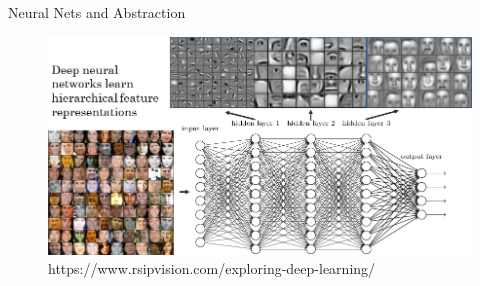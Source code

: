 \documentclass[lualatex, aspectratio=169]{beamer}
\begin{document}
\begin{frame}{Neural Nets and Abstraction}

  \begin{figure}
    \includegraphics[width=0.7\pagewidth]{assets/abstraction.png}
    \caption{https://www.rsipvision.com/exploring-deep-learning/}
  \end{figure}

\end{frame}







\end{document}
